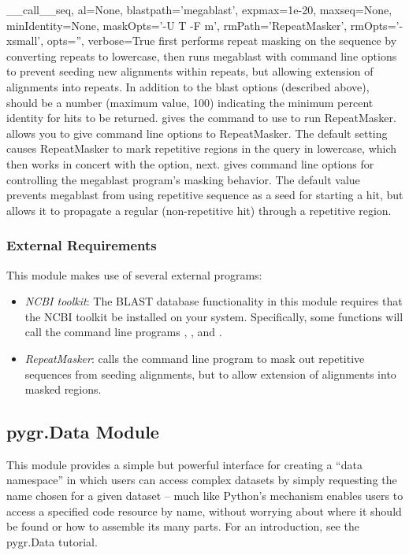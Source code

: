 \documentclass{howto}
\begin{document}
\begin{funcdesc}{__call__}{seq, al=None, blastpath='megablast', expmax=1e-20,
maxseq=None, minIdentity=None, maskOpts='-U T -F m',
rmPath='RepeatMasker', rmOpts='-xsmall', opts='', verbose=True}
  first performs repeat masking on the sequence by converting repeats to lowercase,
  then runs megablast with command line options to prevent seeding new alignments
  within repeats, but allowing extension of alignments into repeats.
  In addition to the blast options (described above),
   should be a number (maximum value, 100)
  indicating the minimum percent identity for hits to be returned.
   gives the command to use to run RepeatMasker.
   allows you to give command line options to RepeatMasker.
  The default setting causes RepeatMasker to mark repetitive regions in the
  query in lowercase, which then works in concert with the  option, next.
   gives command line options for controlling the megablast program's
  masking behavior.  The default value prevents megablast from using repetitive
  sequence as a seed for starting a hit, but allows it to propagate a regular
  (non-repetitive hit) through a repetitive region.
\end{funcdesc}

\subsubsection{External Requirements}
This module makes use of several external programs:
\begin{itemize}
\item
{\em NCBI toolkit}: The BLAST database functionality in this module 
requires that the NCBI toolkit
be installed on your system.  Specifically, some functions will call the command line
programs , , and .

\item
{\em RepeatMasker}:  calls the command line
program  to mask out repetitive sequences from seeding alignments,
but to allow extension of alignments into masked regions.

\end{itemize} 




\subsection{pygr.Data Module}
\label{pygrData-module}
This module provides a simple but powerful interface for creating
a ``data namespace'' in which users can access complex datasets
by simply requesting the name chosen for a given dataset -- much
like Python's  mechanism enables users to access
a specified code resource by name, without worrying about where it
should be found or how to assemble its many parts.  For an introduction,
see the pygr.Data tutorial.
\end{document}
